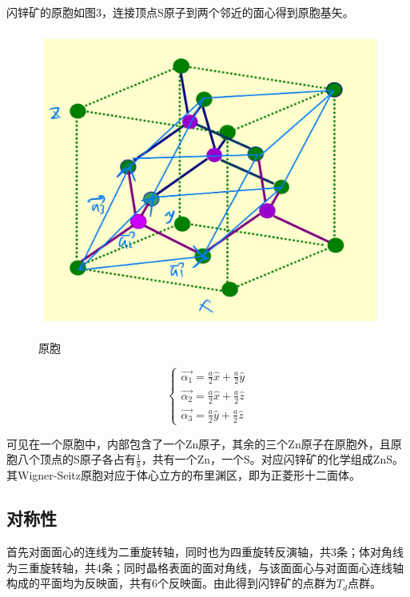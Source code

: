 \documentclass{article}
\begin{document}
	
	闪锌矿的原胞如图3，连接顶点S原子到两个邻近的面心得到原胞基矢。
	\begin{figure}[!h]
		
		\centering
		\includegraphics[scale=0.2]{原胞}
		\caption{\heiti{}原胞}
		
	\end{figure}
	\begin{equation}
		\begin{cases}
			\vec{\alpha_1}=\frac{a}{2}\hat{x}+\frac{a}{2}\hat{y}\\
			\vec{\alpha_2}=\frac{a}{2}\hat{x}+\frac{a}{2}\hat{z}\\
			\vec{\alpha_3}=\frac{a}{2}\hat{y}+\frac{a}{2}\hat{z}
		\end{cases}
	\end{equation}
	
	
	可见在一个原胞中，内部包含了一个Zn原子，其余的三个Zn原子在原胞外，且原胞八个顶点的S原子各占有$ \frac{1}{8} $，共有一个Zn，一个S。对应闪锌矿的化学组成ZnS。其Wigner-Seitz原胞对应于体心立方的布里渊区，即为正菱形十二面体。
	
	
	\subsection{对称性}
	首先对面面心的连线为二重旋转轴，同时也为四重旋转反演轴，共3条；体对角线为三重旋转轴，共4条；同时晶格表面的面对角线，与该面面心与对面面心连线轴构成的平面均为反映面，共有6个反映面。由此得到闪锌矿的点群为$ T_d $点群。
	
\end{document}
